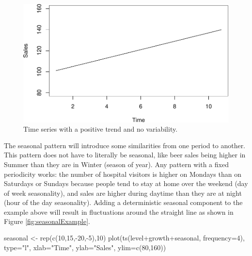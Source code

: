 \documentclass[
]{book}
\newenvironment{Shaded}{\begin{snugshade}}{\end{snugshade}}
\newcommand{\AttributeTok}[1]{\textcolor[rgb]{0.77,0.63,0.00}{#1}}
\newcommand{\DecValTok}[1]{\textcolor[rgb]{0.00,0.00,0.81}{#1}}
\newcommand{\FunctionTok}[1]{\textcolor[rgb]{0.00,0.00,0.00}{#1}}
\newcommand{\NormalTok}[1]{#1}
\newcommand{\OtherTok}[1]{\textcolor[rgb]{0.56,0.35,0.01}{#1}}
\newcommand{\SpecialCharTok}[1]{\textcolor[rgb]{0.00,0.00,0.00}{#1}}
\newcommand{\StringTok}[1]{\textcolor[rgb]{0.31,0.60,0.02}{#1}}
\theoremstyle{definition}
\theoremstyle{definition}
\theoremstyle{definition}
\theoremstyle{definition}
\theoremstyle{remark}
\begin{document}
\begin{figure}
\centering
\includegraphics{adam_files/figure-latex/trendExample-1.pdf}
\caption{\label{fig:trendExample}Time series with a positive trend and no variability.}
\end{figure}

The seasonal pattern will introduce some similarities from one period to another. This pattern does not have to literally be seasonal, like beer sales being higher in Summer than they are in Winter (season of year). Any pattern with a fixed periodicity works: the number of hospital visitors is higher on Mondays than on Saturdays or Sundays because people tend to stay at home over the weekend (day of week seasonality), and sales are higher during daytime than they are at night (hour of the day seasonality). Adding a deterministic seasonal component to the example above will result in fluctuations around the straight line as shown in Figure \ref{fig:seasonalExample}.

\begin{Shaded}
\begin{Highlighting}[]
\NormalTok{seasonal }\OtherTok{\textless{}{-}} \FunctionTok{rep}\NormalTok{(}\FunctionTok{c}\NormalTok{(}\DecValTok{10}\NormalTok{,}\DecValTok{15}\NormalTok{,}\SpecialCharTok{{-}}\DecValTok{20}\NormalTok{,}\SpecialCharTok{{-}}\DecValTok{5}\NormalTok{),}\DecValTok{10}\NormalTok{)}
\FunctionTok{plot}\NormalTok{(}\FunctionTok{ts}\NormalTok{(level}\SpecialCharTok{+}\NormalTok{growth}\SpecialCharTok{+}\NormalTok{seasonal, }\AttributeTok{frequency=}\DecValTok{4}\NormalTok{),}
     \AttributeTok{type=}\StringTok{"l"}\NormalTok{, }\AttributeTok{xlab=}\StringTok{"Time"}\NormalTok{, }\AttributeTok{ylab=}\StringTok{"Sales"}\NormalTok{, }\AttributeTok{ylim=}\FunctionTok{c}\NormalTok{(}\DecValTok{80}\NormalTok{,}\DecValTok{160}\NormalTok{))}
\end{Highlighting}
\end{Shaded}
\end{document}
